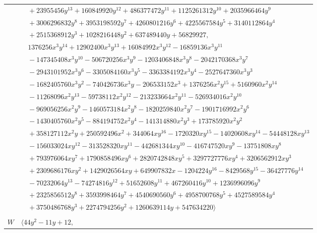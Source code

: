\documentclass[11pt]{article}
\begin{document}
\begin{longtable}{@{}ll@{}}
 & $\quad +23955456y^{13}+160849920y^{12}+486377472y^{11}+1125261312y^{10}+2035966464y^{9}$\\
 & $\quad +3006296832y^{8}+3953198592y^{7}+4260801216y^{6}+4225567584y^{5}+3140112864y^{4}$\\
 & $\quad +2515368912y^{3}+1028216448y^{2}+637489440y+56829927,$\\
 & $\quad 1376256x^{3}y^{14}+12902400x^{3}y^{13}+16084992x^{3}y^{12}-16859136x^{3}y^{11}$\\
 & $\quad -147345408x^{3}y^{10}-506720256x^{3}y^{9}-1203406848x^{3}y^{8}-2042170368x^{3}y^{7}$\\
 & $\quad -2943101952x^{3}y^{6}-3305084160x^{3}y^{5}-3363384192x^{3}y^{4}-2527647360x^{3}y^{3}$\\
 & $\quad -1682405760x^{3}y^{2}-740426736x^{3}y-206533152x^{3}+1376256x^{2}y^{15}+5160960x^{2}y^{14}$\\
 & $\quad -11268096x^{2}y^{13}-59738112x^{2}y^{12}-213233664x^{2}y^{11}-526934016x^{2}y^{10}$\\
 & $\quad -969056256x^{2}y^{9}-1460573184x^{2}y^{8}-1820259840x^{2}y^{7}-1901716992x^{2}y^{6}$\\
 & $\quad -1430405760x^{2}y^{5}-884194752x^{2}y^{4}-141314880x^{2}y^{3}+173785920x^{2}y^{2}$\\
 & $\quad +358127112x^{2}y+250592496x^{2}+344064xy^{16}-1720320xy^{15}-14020608xy^{14}-54448128xy^{13}$\\
 & $\quad -156033024xy^{12}-313528320xy^{11}-442681344xy^{10}-416747520xy^{9}-13751808xy^{8}$\\
 & $\quad +793976064xy^{7}+1790858496xy^{6}+2820742848xy^{5}+3297727776xy^{4}+3206562912xy^{3}$\\
 & $\quad +2309686176xy^{2}+1429026564xy+649907832x-1204224y^{16}-8429568y^{15}-36427776y^{14}$\\
 & $\quad -70232064y^{13}-74274816y^{12}+51652608y^{11}+467260416y^{10}+1236996096y^{9}$\\
 & $\quad +2325856512y^{8}+3593998464y^{7}+4540690560y^{6}+4958700768y^{5}+4527589584y^{4}$\\
 & $\quad +3750486768y^{3}+2274794256y^{2}+1260639114y+547634220\rangle$\\
\addlinespace[2pt]
\multicolumn{2}{@{}p{0.97\textwidth}@{}}{$i=15$, $D_i=16$, $\rho_{ij}$: $0{:}1, \allowbreak 2{:}2, \allowbreak 22{:}1, \allowbreak 31{:}1, \allowbreak 32{:}2, \allowbreak 36{:}1, \allowbreak 37{:}1, \allowbreak 55{:}2, \allowbreak 64{:}1$}\\
$W$ & $\langle 44y^{2}-11y+12,$\\

\end{longtable}
\end{document}
